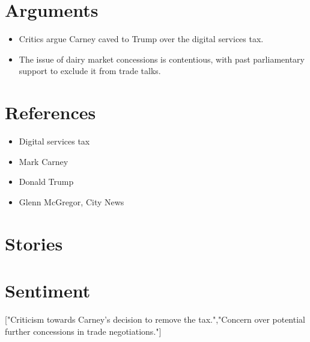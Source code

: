 \documentclass{article}
\begin{document}
\section{Arguments}
\begin{itemize}[leftmargin=*]
  \item Critics argue Carney caved to Trump over the digital services tax.
  \item The issue of dairy market concessions is contentious, with past parliamentary support to exclude it from trade talks.
\end{itemize}

\section{References}
\begin{itemize}[leftmargin=*]
  \item Digital services tax
  \item Mark Carney
  \item Donald Trump
  \item Glenn McGregor, City News
\end{itemize}

\section{Stories}
\begin{itemize}[leftmargin=*]
\end{itemize}

\section{Sentiment}
["Criticism towards Carney's decision to remove the tax.","Concern over potential further concessions in trade negotiations."]
\end{document}
